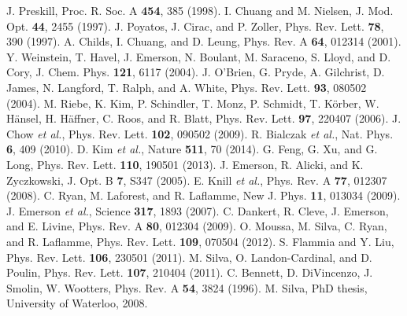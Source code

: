\documentclass[prl,twocolumn,showpacs,superscriptaddress]{revtex4-1}
\begin{document}
\begin{thebibliography}{99}
 J. Preskill, Proc. R. Soc. A \textbf{454}, 385 (1998).
 I. Chuang and M. Nielsen, J. Mod. Opt. \textbf{44}, 2455 (1997).
 J. Poyatos, J. Cirac, and P. Zoller, Phys. Rev. Lett. \textbf{78}, 390 (1997).
 A. Childs, I. Chuang, and D. Leung, Phys. Rev. A \textbf{64}, 012314 (2001).
 Y. Weinstein, T. Havel, J. Emerson, N. Boulant, M. Saraceno, S. Lloyd, and D. Cory, J. Chem. Phys. \textbf{121}, 6117 (2004).
 J. O'Brien, G. Pryde, A. Gilchrist, D. James, N. Langford, T. Ralph, and A. White, Phys. Rev. Lett. \textbf{93}, 080502 (2004).
 M. Riebe, K. Kim, P. Schindler, T. Monz, P. Schmidt, T. K\"{o}rber, W. H\"{a}nsel, H. H\"{a}ffner, C. Roos, and R. Blatt, Phys. Rev. Lett. \textbf{97}, 220407 (2006).
 J. Chow \emph{et al.}, Phys. Rev. Lett. \textbf{102}, 090502 (2009).
 R. Bialczak \emph{et al.}, Nat. Phys. \textbf{6}, 409 (2010).
 D. Kim \emph{et al.}, Nature \textbf{511}, 70 (2014).
 G. Feng, G.  Xu, and G. Long,  Phys. Rev. Lett. \textbf{110}, 190501 (2013).
 J. Emerson, R. Alicki, and K. Zyczkowski, J. Opt. B \textbf{7}, S347 (2005).
 E. Knill \emph{et al.}, Phys. Rev. A \textbf{77}, 012307 (2008).
 C. Ryan, M. Laforest, and R. Laflamme, New J. Phys. \textbf{11}, 013034 (2009).
 J. Emerson \emph{et al.}, Science \textbf{317}, 1893 (2007).
 C. Dankert, R. Cleve, J. Emerson, and E. Livine, Phys. Rev. A \textbf{80}, 012304 (2009).
 O. Moussa, M. Silva, C. Ryan, and R. Laflamme, Phys. Rev. Lett. \textbf{109}, 070504 (2012).
 S. Flammia and Y. Liu, Phys. Rev. Lett. \textbf{106}, 230501 (2011).
 M. Silva, O. Landon-Cardinal, and D. Poulin, Phys. Rev. Lett. \textbf{107}, 210404 (2011).
 C. Bennett, D. DiVincenzo, J. Smolin, W. Wootters, Phys. Rev. A \textbf{54}, 3824 (1996).
 M. Silva, PhD thesis, University of Waterloo, 2008.

\end{thebibliography}
\end{document}
